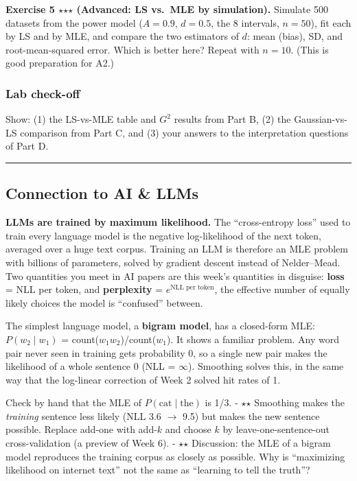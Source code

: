 \textbf{Exercise 5 \ensuremath{\star}\ensuremath{\star}\ensuremath{\star} (Advanced: LS vs.~MLE by simulation).} Simulate
500 datasets from the power model (\(A = 0.9\), \(d = 0.5\), the 8
intervals, \(n = 50\)), fit each by LS and by MLE, and compare the two
estimators of \(d\): mean (bias), SD, and root-mean-squared error. Which
is better here? Repeat with \(n = 10\). (This is good preparation for
A2.)

\subsubsection{Lab check-off}

Show: (1) the LS-vs-MLE table and \(G^2\) results from Part B, (2) the
Gaussian-vs-LS comparison from Part C, and (3) your answers to the
interpretation questions of Part D.

\begin{center}\rule{0.5\linewidth}{0.5pt}\end{center}

\subsection{Connection to AI \& LLMs}

\textbf{LLMs are trained by maximum likelihood.} The ``cross-entropy
loss'' used to train every language model is the negative log-likelihood
of the next token, averaged over a huge text corpus. Training an LLM is
therefore an MLE problem with billions of parameters, solved by gradient
descent instead of Nelder--Mead. Two quantities you meet in AI papers
are this week's quantities in disguise: \textbf{loss} = NLL per token,
and \textbf{perplexity} = \(e^{\text{NLL per token}}\), the effective
number of equally likely choices the model is ``confused'' between.

The simplest language model, a \textbf{bigram model}, has a closed-form
MLE: \(P(w_2\mid w_1)\) = count(\(w_1 w_2\))/count(\(w_1\)). It shows a
familiar problem. Any word pair never seen in training gets probability
0, so a single new pair makes the likelihood of a whole sentence 0 (NLL
= \ensuremath{\infty}). Smoothing solves this, in the same way that the log-linear
correction of Week 2 solved hit rates of 1.

Check by hand that the MLE of \(P(\text{cat}\mid\text{the})\) is 1/3. -
\ensuremath{\star}\ensuremath{\star} Smoothing makes the \emph{training} sentence less likely (NLL 3.6 \ensuremath{\rightarrow}
9.5) but makes the new sentence possible. Replace add-one with add-\(k\)
and choose \(k\) by leave-one-sentence-out cross-validation (a preview
of Week 6). - \ensuremath{\star}\ensuremath{\star} Discussion: the MLE of a bigram model reproduces the
training corpus as closely as possible. Why is ``maximizing likelihood
on internet text'' not the same as ``learning to tell the truth''?

